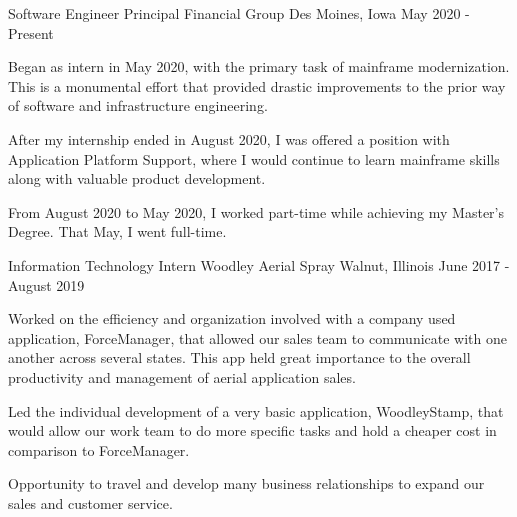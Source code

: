 \begin{cventries}
    \cventry
    {Software Engineer} %
    {Principal Financial Group} %
    {Des Moines, Iowa} %
    {May 2020 - Present} %
    {
      \begin{cvitems} %
        \item {Began as intern in May 2020, with the primary task of mainframe modernization. This is a monumental effort that provided drastic         improvements to the prior way of software and infrastructure             engineering.}
        \item {After my internship ended in August 2020, I was offered a position with Application Platform Support, where I would continue to learn       mainframe skills along with valuable product development.}
        \item {From August 2020 to May 2020, I worked part-time while           achieving my Master's Degree. That May, I went full-time.}
      \end{cvitems}
    }
    
    \cventry
    {Information Technology Intern} %
    {Woodley Aerial Spray} %
    {Walnut, Illinois} %
    {June 2017 - August 2019} %
    {
      \begin{cvitems} %
        \item {Worked on the efficiency and organization involved with a company used application, ForceManager, that allowed our sales team to           communicate with one another across several states. This app held        great importance to the overall productivity and management of aerial    application sales.}
        \item {Led the individual development of a very basic application,      WoodleyStamp, that would allow our work team to do more specific         tasks and hold a cheaper cost in comparison to ForceManager.}
        \item {Opportunity to travel and develop many business relationships to expand our sales and customer service.}
      \end{cvitems}
    }
    

\end{cventries}
